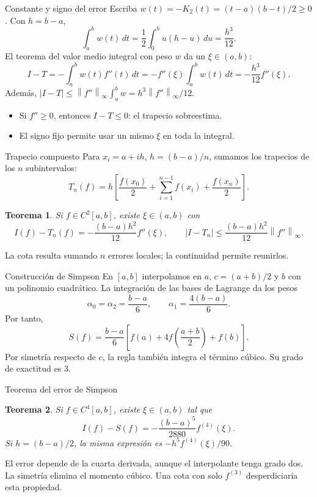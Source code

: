 \documentclass[aspectratio=169,12pt]{beamer}
\newcommand{\norm}[1]{\left\lVert#1\right\rVert}
\newtheorem{thm}{Teorema}
\begin{document}
\begin{frame}{Constante y signo del error}
Escriba $w(t)=-K_2(t)=(t-a)(b-t)/2\geq0$. Con $h=b-a$,
\[
\int_a^b w(t)\,dt=\frac12\int_0^h u(h-u)\,du
=\frac{h^3}{12}.
\]
El teorema del valor medio integral con peso $w$ da un $\xi\in(a,b)$:
\[
I-T=-\int_a^b w(t)f''(t)\,dt
=-f''(\xi)\int_a^b w(t)\,dt
=-\frac{h^3}{12}f''(\xi).
\]
Además, $|I-T|\leq\norm{f''}_\infty\int_a^b w=h^3\norm{f''}_\infty/12$.
\begin{itemize}
\item Si $f''\geq0$, entonces $I-T\leq0$: el trapecio sobreestima.
\item El signo fijo permite usar un mismo $\xi$ en toda la integral.
\end{itemize}
\end{frame}

\begin{frame}{Trapecio compuesto}
Para $x_i=a+ih$, $h=(b-a)/n$, sumamos los trapecios de los $n$ subintervalos:
\[\boxed{T_n(f)=h\left[\frac{f(x_0)}2+
\sum_{i=1}^{n-1}f(x_i)+\frac{f(x_n)}2\right].}\]
\begin{thm}
Si $f\in C^2[a,b]$, existe $\xi\in(a,b)$ con
\[I(f)-T_n(f)=-\frac{(b-a)h^2}{12}f''(\xi),\qquad
|I-T_n|\leq\frac{(b-a)h^2}{12}\norm{f''}_\infty.\]
\end{thm}
La cota resulta sumando $n$ errores locales; la continuidad permite reunirlos.
\end{frame}

\begin{frame}{Construcción de Simpson}
En $[a,b]$ interpolamos en $a$, $c=(a+b)/2$ y $b$ con un polinomio cuadrático.
La integración de las bases de Lagrange da los pesos
\[\alpha_0=\alpha_2=\frac{b-a}{6},\qquad
\alpha_1=\frac{4(b-a)}6.\]
Por tanto,
\[\boxed{S(f)=\frac{b-a}{6}\left[f(a)+4f\left(\frac{a+b}2\right)+f(b)\right].}\]
Por simetría respecto de $c$, la regla también integra el término cúbico.
Su grado de exactitud es $3$.
\end{frame}

\begin{frame}{Teorema del error de Simpson}
\begin{thm}
Si $f\in C^4[a,b]$, existe $\xi\in(a,b)$ tal que
\[I(f)-S(f)=-\frac{(b-a)^5}{2880}f^{(4)}(\xi).\]
Si $h=(b-a)/2$, la misma expresión es $-h^5f^{(4)}(\xi)/90$.
\end{thm}
El error depende de la cuarta derivada, aunque el interpolante tenga grado dos.
La simetría elimina el momento cúbico. Una cota con solo $f^{(3)}$ desperdiciaría
esta propiedad.
\end{frame}
\end{document}
